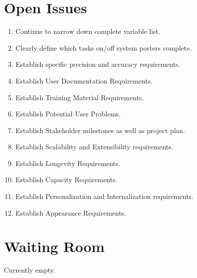 \documentclass[paper=letter, fontsize=10pt]{scrartcl}
\numberwithin{equation}{section}		%
\numberwithin{figure}{section}			%
\numberwithin{table}{section}				%
\begin{document}
\section{Open Issues}
\begin{enumerate}
	\item Continue to narrow down complete variable list.
	\item Clearly define which tasks on/off system porters complete.
	\item Establish specific precision and accuracy requirements.
	\item Establish User Documentation Requirements.
	\item Establish Training Material Requirements.
	\item Establish Potential User Problems.
	\item Establish Stakeholder milestones as well as project plan.
	\item Establish Scalability and Extensibility requirements.
	\item Establish Longevity Requirements.
	\item Establish Capacity Requirements.
	\item Establish Personalization and Internalization requirements.
	\item Establish Appearance Requirements.
\end{enumerate}

\section{Waiting Room}
Currently empty.


\end{document}
